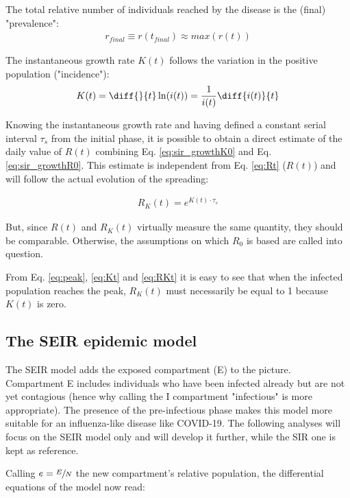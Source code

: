 \documentclass[DIV=12, BCOR=0pt]{scrartcl}  %
\begin{document}
The total relative number of individuals reached by the disease is the (final) "prevalence": 
\begin{align}
	r_{final} \equiv r(t_{final}) \approx max(r(t))
\end{align}
  
  The instantaneous growth rate $K(t)$ follows the variation in the positive population ("incidence"):
  \begin{align}
  	K(t) =  \diff{}{t} \ln(i(t)) = \frac{1}{i(t)} \diff{i(t)}{t} 
  	\label{eq:Kt}
  \end{align}

	Knowing the instantaneous growth rate and having defined a constant serial interval $\tau_s$ from the initial phase, it is possible to obtain a direct estimate of the daily value of $R(t)$ combining Eq. \ref{eq:sir_growthK0} and Eq. \ref{eq:sir_growthR0}. This estimate is independent from Eq. \ref{eq:Rt} ($R(t)$) and will follow the actual evolution of the spreading:

  \begin{align}
  	R_K(t) = e^{K(t) \cdot \tau_s}
  	\label{eq:RKt}
  \end{align}

	But, since $R(t)$ and $R_K(t)$ virtually measure the same quantity, they should be comparable. Otherwise, the assumptions on which $R_0$ is based are called into question.
  
  From Eq. \ref{eq:peak}, \ref{eq:Kt} and \ref{eq:RKt} it is easy to see that when the infected population reaches the peak, $R_K(t)$ must necessarily be equal to 1 because $K(t)$ is zero.
  
  
  \subsection{The SEIR epidemic model}
  The SEIR model adds the exposed compartment (E) to the picture. Compartment E includes individuals who have been infected already but are not yet contagious (hence why calling the I compartment "infectious" is more appropriate). The presence of the pre-infectious phase makes this model more suitable for an influenza-like disease like COVID-19. The following analyses will focus on the SEIR model only and will develop it further, while the SIR one is kept as reference.
  
  Calling $e = \sfrac{E}{N}$ the new compartment's relative population, the differential equations of the model now read:
  
\end{document}
